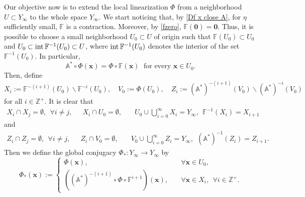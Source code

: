 \documentclass[reqno, a4paper, 10pt]{amsart}
\theoremstyle{plain}
\numberwithin{equation}{section}
\theoremstyle{remark}
\def\Z{\mathbb{Z}}
\begin{document}
Our objective now is to extend the local linearization $\Phi$ from a neighborhood $U\subset Y_\infty$ to the whole space $Y_\infty$. We start noticing that, by \eqref{Df x close A}, for $\eta$ sufficiently small, $\mathbb{F}$ is a contraction. Moreover, by \eqref{fzero}, $\mathbb F(\mathbf 0)=\mathbf 0$. Thus, it is possible to choose a small neighborhood $U_0\subset U$ of origin such that $\mathbb{F} (U_0)\subset U_0$ and 
$U_0\subset {\rm int}\, \mathbb{F}^{-1}(U_0)\subset U$,
where ${\rm int} \, \mathbb{F}^{-1}(U_0)$ denotes the interior of the set $\mathbb{F}^{-1}(U_0)$. In particular,
\begin{equation}\label{eq: lin on U0}
    \mathbb A^\ast \circ \Phi (\mathbf x)=\Phi \circ \mathbb F(\mathbf x) \; \text{ for every } \mathbf{x}\in U_0.
\end{equation}
Then, define
\[
X_i:=\mathbb{F}^{-(i+1)}(U_0)\backslash \mathbb{F}^{-i}(U_0),\quad V_0:=\Phi(U_0),\quad Z_i:=(\mathbb{A}^\ast)^{-(i+1)} (V_0)\backslash (\mathbb{A}^\ast)^{-i}(V_0)
\]
for all $i\in \Z^+$.
It is clear that
\begin{align*}
X_i\cap X_j=\emptyset, ~~ \forall i\ne j,\quad ~~ X_i\cap U_0=\emptyset, \quad &U_0\cup \bigcup_{i=0}^{\infty}X_i=Y_\infty,~ ~\mathbb{F}^{-1}(X_i)=X_{i+1}
\end{align*}
and
\begin{align*}
Z_i\cap Z_j=\emptyset,  ~~\forall i\ne j, \quad  ~~Z_i\cap V_0=\emptyset,  \quad &V_0\cup \bigcup_{i=0}^{\infty}Z_i=Y_\infty,   ~~(\mathbb{A}^\ast)^{-1}(Z_i)=Z_{i+1}.
\end{align*}
Then we define the global conjugacy $\Phi_*\colon Y_\infty\to Y_\infty$ by
\[
\Phi_*(\mathbf x):=
\left\{\begin{array}{lll}
\Phi(\mathbf x), & \quad\forall \mathbf x\in U_0,
\\
((\mathbb A^\ast )^{-(i+1)}\circ \Phi \circ \mathbb F^{i+1}) (\mathbf x), & \quad\forall \mathbf x\in X_i, ~~\forall i\in \Z^+.
\end{array}\right.
\]
\end{document}
